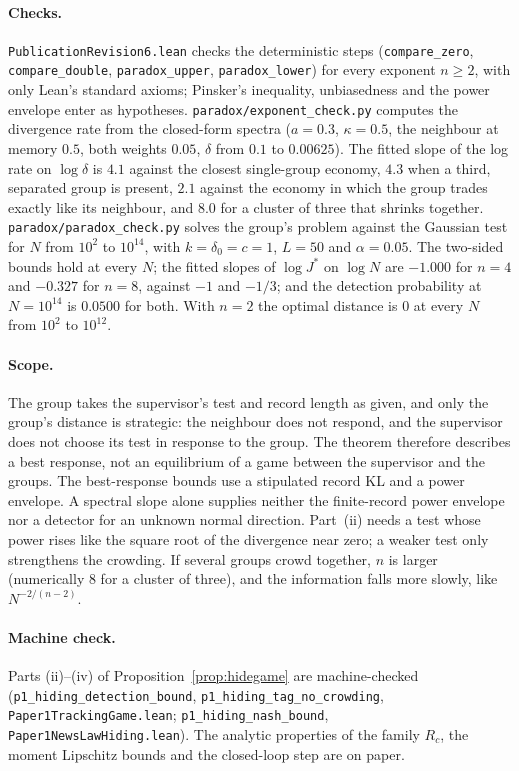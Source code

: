 \documentclass[12pt]{article}
\theoremstyle{definition}
\theoremstyle{remark}
\begin{document}
\paragraph{Checks.} \nolinkurl{PublicationRevision6.lean} checks the deterministic steps (\nolinkurl{compare_zero}, \nolinkurl{compare_double}, \nolinkurl{paradox_upper}, \nolinkurl{paradox_lower}) for every exponent $n\ge2$, with only Lean's standard axioms; Pinsker's inequality, unbiasedness and the power envelope enter as hypotheses. \nolinkurl{paradox/exponent_check.py} computes the divergence rate from the closed-form spectra ($a=0.3$, $\kappa=0.5$, the neighbour at memory $0.5$, both weights $0.05$, $\delta$ from $0.1$ to $0.00625$). The fitted slope of the log rate on $\log\delta$ is $4.1$ against the closest single-group economy, $4.3$ when a third, separated group is present, $2.1$ against the economy in which the group trades exactly like its neighbour, and $8.0$ for a cluster of three that shrinks together. \nolinkurl{paradox/paradox_check.py} solves the group's problem against the Gaussian test for $N$ from $10^2$ to $10^{14}$, with $k=\delta_0=c=1$, $L=50$ and $\alpha=0.05$. The two-sided bounds hold at every $N$; the fitted slopes of $\log J^*$ on $\log N$ are $-1.000$ for $n=4$ and $-0.327$ for $n=8$, against $-1$ and $-1/3$; and the detection probability at $N=10^{14}$ is $0.0500$ for both. With $n=2$ the optimal distance is $0$ at every $N$ from $10^2$ to $10^{12}$.

\paragraph{Scope.} The group takes the supervisor's test and record length as given, and only the group's distance is strategic: the neighbour does not respond, and the supervisor does not choose its test in response to the group. The theorem therefore describes a best response, not an equilibrium of a game between the supervisor and the groups. The best-response bounds use a stipulated record KL and a power envelope. A spectral slope alone supplies neither the finite-record power envelope nor a detector for an unknown normal direction. Part~(ii) needs a test whose power rises like the square root of the divergence near zero; a weaker test only strengthens the crowding. If several groups crowd together, $n$ is larger (numerically $8$ for a cluster of three), and the information falls more slowly, like $N^{-2/(n-2)}$.

\paragraph{Machine check.} Parts (ii)--(iv) of Proposition~\ref{prop:hidegame} are machine-checked (\texttt{p1\_hiding\_detection\_bound}, \texttt{p1\_hiding\_tag\_no\_crowding}, \nolinkurl{Paper1TrackingGame.lean}; \texttt{p1\_hiding\_nash\_bound}, \nolinkurl{Paper1NewsLawHiding.lean}). The analytic properties of the family $R_c$, the moment Lipschitz bounds and the closed-loop step are on paper.
\end{document}

